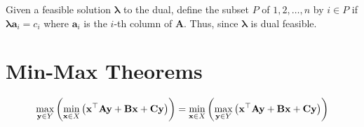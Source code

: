 Given a feasible solution $\pmb{\lambda}$ to the dual, define the subset $P$ of $1,2,\dots, n$ by $i\in P$ if $\pmb{\lambda}\mathbf{a}_i=c_i$ where $\mathbf{a}_i$ is the $i$-th column of $\mathbf{A}$. Thus, since $\pmb{\lambda}$ is dual feasible.

\section{Min-Max Theorems}

\begin{equation}
\max_{\mathbf y\in Y}\left( \min_{\mathbf x \in X}	\left( \mathbf{x}^\top\mathbf{A}\mathbf{y}+\mathbf{B}\mathbf{x} +\mathbf{C}\mathbf{y} \right) \right) =\min_{\mathbf x\in X}\left( \max_{\mathbf y \in Y}	\left( \mathbf{x}^\top\mathbf{A}\mathbf{y}+\mathbf{B}\mathbf{x} +\mathbf{C}\mathbf{y} \right) \right)
\end{equation}

